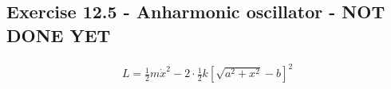 \documentclass[../main.tex]{subfiles}
\begin{document}
\subsection{Exercise 12.5 - Anharmonic oscillator - NOT DONE YET}

\begin{align}
L=\frac{1}{2}m\dot{x}^2-2\cdot\frac{1}{2}k[\sqrt{a^2+x^2}-b]^2
\end{align}
\end{document}
